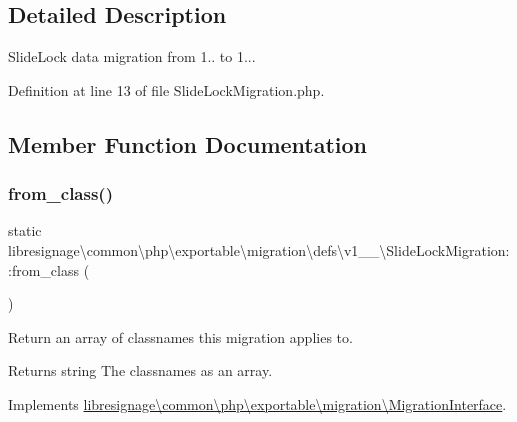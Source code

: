 \subsection{Detailed Description}
Slide\+Lock data migration from 1.. to 1... 

Definition at line 13 of file Slide\+Lock\+Migration.\+php.



\subsection{Member Function Documentation}
\mbox{\label{classlibresignage_1_1common_1_1php_1_1exportable_1_1migration_1_1defs_1_1v1__0__0_1_1SlideLockMigration_acbc046ff4058376908f733d7a4477d35}} 
\subsubsection{\texorpdfstring{from\+\_\+class()}{from\_class()}}
{\footnotesize\ttfamily static libresignage\textbackslash{}common\textbackslash{}php\textbackslash{}exportable\textbackslash{}migration\textbackslash{}defs\textbackslash{}v1\+\_\+\_\textbackslash{}\+Slide\+Lock\+Migration\+::from\+\_\+class (\begin{DoxyParamCaption}{ }\end{DoxyParamCaption})\hspace{0.3cm}{\ttfamily [static]}}

Return an array of classnames this migration applies to.

\begin{DoxyReturn}{Returns}
string The classnames as an array. 
\end{DoxyReturn}


Implements \hyperlink{interfacelibresignage_1_1common_1_1php_1_1exportable_1_1migration_1_1MigrationInterface_aa8eb2e4ff59358ae551061687540f724}{libresignage\textbackslash{}common\textbackslash{}php\textbackslash{}exportable\textbackslash{}migration\textbackslash{}\+Migration\+Interface}.



